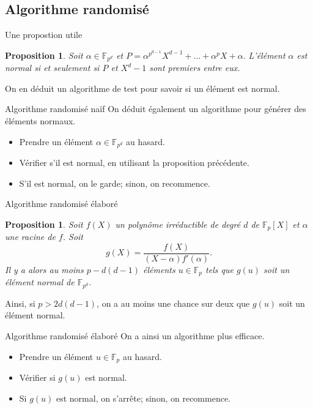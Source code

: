 \documentclass[xcolor=x11names,compress]{beamer}
\theoremstyle{break}
\newtheorem{prop}[thm]{Proposition}
\theoremstyle{sc}
\theoremstyle{definition}
\theoremstyle{remark}
\begin{document}
\subsection{Algorithme randomisé}
\begin{frame}{Une propostion utile}
  \begin{prop}
    Soit $\alpha\in\mathbb{F}_{p^d}$ et
    $P=\alpha^{p^{d-1}}X^{d-1}+\dots+\alpha^pX+\alpha.$
    L'élément $\alpha$ est normal si et seulement si $P$ et $X^d-1$ sont
    premiers entre eux.
  \end{prop}
  On en déduit un algorithme de test pour savoir si un élément est normal.
\end{frame}

\begin{frame}{Algorithme randomisé naïf}
  On déduit également un algorithme pour générer des éléments normaux.
  \begin{itemize}
    \item<2-> Prendre un élément $\alpha\in\mathbb{F}_{p^d}$ au hasard.
    \item<3-> Vérifier s'il est normal, en utilisant la proposition précédente. 
    \item<4-> S'il est normal, on le garde; sinon, on recommence.
  \end{itemize}

\end{frame}

\begin{frame}{Algorithme randomisé élaboré}
  \begin{prop}
    Soit $f(X)$ un polynôme irréductible de degré $d$ de $\mathbb{F}_p[X]$ et
    $\alpha$ une racine de $f$. Soit 
    \[
      g(X) = \frac{f(X)}{(X-\alpha)f'(\alpha)}.
    \]
    Il y a alors au moins $p-d(d-1)$ éléments $u\in\mathbb{F}_p$ tels que $g(u)$
    soit un élément normal de $\mathbb{F}_{p^d}$.
  \end{prop}
  Ainsi, si $p>2d(d-1)$, on a au moins une chance sur deux que $g(u)$ soit un
  élément normal.
\end{frame}

\begin{frame}{Algorithme randomisé élaboré}
  On a ainsi un algorithme plus efficace.
  \begin{itemize}
    \item<2-> Prendre un élément $u\in\mathbb{F}_{p}$ au hasard.
    \item<3-> Vérifier si $g(u)$ est normal. 
    \item<4-> Si $g(u)$ est normal, on s'arrête; sinon, on recommence.
  \end{itemize}

\end{frame}
\end{document}
